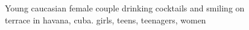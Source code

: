 \begin{figure}[t]
        \caption{Young caucasian female couple drinking cocktails and smiling on terrace in havana, cuba.   girls, teens, teenagers, women}

\end{figure}


